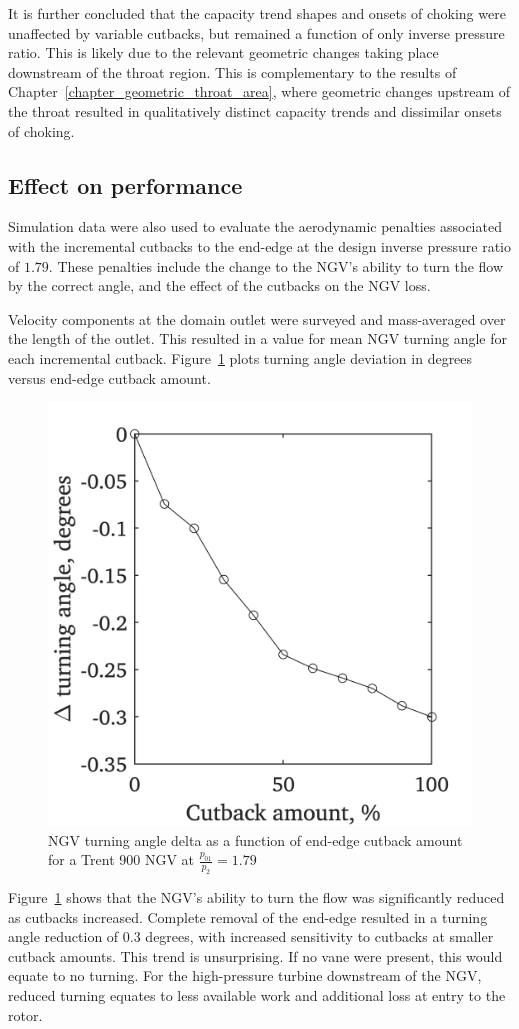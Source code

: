 \documentclass[a4paper, 11pt, oneside]{report}
\begin{document}
It is further concluded that the capacity trend shapes and onsets of choking were unaffected by variable cutbacks, but remained a function of only inverse pressure ratio. This is likely due to the relevant geometric changes taking place downstream of the throat region. This is complementary to the results of Chapter~\ref{chapter_geometric_throat_area}, where geometric changes upstream of the throat resulted in qualitatively distinct capacity trends and dissimilar onsets of choking.

\subsection{Effect on performance}

Simulation data were also used to evaluate the aerodynamic penalties associated with the incremental cutbacks to the end-edge at the design inverse pressure ratio of $1.79$. These penalties include the change to the NGV's ability to turn the flow by the correct angle, and the effect of the cutbacks on the NGV loss.

Velocity components at the domain outlet were surveyed and mass-averaged over the length of the outlet. This resulted in a value for mean NGV turning angle for each incremental cutback. Figure~\ref{fig:ss_cutbacks_vs_turning_angles} plots turning angle deviation in degrees versus end-edge cutback amount.

\begin{figure}[H]
	\centering
	\includegraphics[width=.45\textwidth]{figs/ss_cutbacks_vs_turning_angles.png}
	\caption{NGV turning angle delta as a function of end-edge cutback amount for a Trent 900 NGV at $\frac{p_{01}}{p_2}=1.79$}
    \label{fig:ss_cutbacks_vs_turning_angles}
\end{figure}

Figure~\ref{fig:ss_cutbacks_vs_turning_angles} shows that the NGV's ability to turn the flow was significantly reduced as cutbacks increased. Complete removal of the end-edge resulted in a turning angle reduction of $0.3$ degrees, with increased sensitivity to cutbacks at smaller cutback amounts. This trend is unsurprising. If no vane were present, this would equate to no turning. For the high-pressure turbine downstream of the NGV, reduced turning equates to less available work and additional loss at entry to the rotor.
\end{document}
